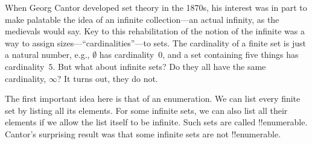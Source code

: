 \documentclass[../../../include/open-logic-section]{subfiles}
\begin{document}


When Georg Cantor developed set theory in the 1870s, his interest was
in part to make palatable the idea of an infinite collection---an
actual infinity, as the medievals would say.  Key to this
rehabilitation of the notion of the infinite was a way to assign
sizes---``cardinalities''---to sets.  The cardinality of a finite set
is just a natural number, e.g., $\emptyset$ has cardinality~0, and a
set containing five things has cardinality~$5$.  But what about
infinite sets?  Do they all have the same cardinality, $\infty$?  It
turns out, they do not.

The first important idea here is that of an enumeration.  We can list
every finite set by listing all its elements.  For some infinite sets,
we can also list all their elements if we allow the list itself to be
infinite.  Such sets are called !!{enumerable}.  Cantor's surprising
result was that some infinite sets are not !!{enumerable}.
\end{document}
